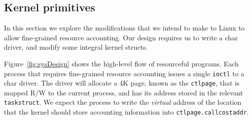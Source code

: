 \documentclass[12pt]{article}
\def\_{\textunderscore\-}
\begin{document}
%
%
%

  \subsection{Kernel primitives}\label{kernelprimitives}

  In this section we explore the modifications that we intend to make to Linux to allow fine-grained resource accounting. Our design requires us to write a char driver, and modify some integral kernel structs.

  Figure~\ref{fig:sysDesign} shows the high-level flow of resourceful programs. Each process that requires fine-grained resource accounting issues a single \texttt{ioctl} to a char driver. The driver will allocate a 4K page, known as the \texttt{ctl\_page}, that is mapped R/W to the current process, and has its address stored in the relevant \texttt{task\_struct}. We expect the process to write the \emph{virtual} address of the location that the kernel should store accounting information into \texttt{ctl\_page.call\_cost\_addr}.
\end{document}
